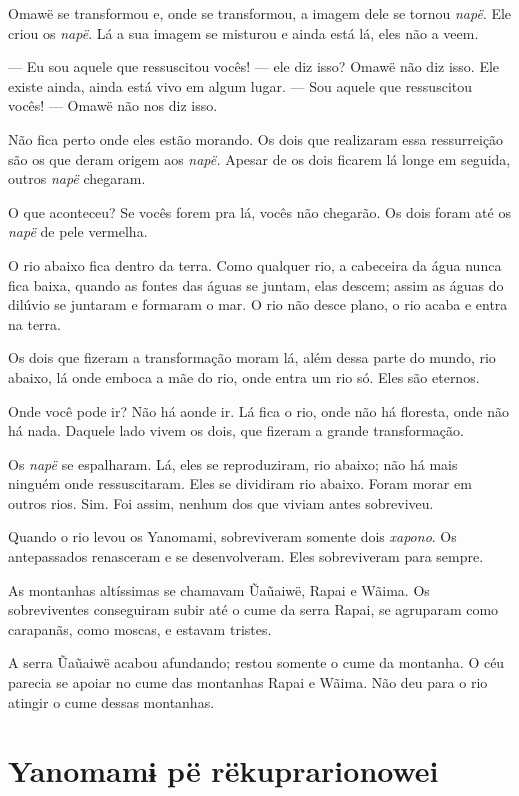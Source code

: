 Omawë se transformou e, onde se transformou, a imagem dele se
tornou \textit{napë}. Ele criou os \textit{napë}. Lá a sua imagem se misturou
e ainda está lá, eles não a veem. 

--- Eu sou aquele que ressuscitou vocês! --- ele diz isso? Omawë não diz
isso. Ele existe ainda, ainda está vivo em algum lugar. --- Sou aquele que
ressuscitou vocês! --- Omawë não nos diz isso. 

Não fica perto onde eles estão morando. Os dois que realizaram essa
ressurreição são os que deram origem aos \textit{napë.} Apesar de os dois
ficarem lá longe em seguida, outros \textit{napë} chegaram. 

O que aconteceu? Se vocês forem pra lá, vocês não chegarão. Os dois
foram até os \textit{napë} de pele vermelha. 

O rio abaixo fica dentro da terra. Como qualquer rio, a cabeceira da
água nunca fica baixa, quando as fontes das águas se juntam, elas
descem; assim as águas do dilúvio se juntaram e formaram o mar. O rio
não desce plano, o rio acaba e entra na terra. 

Os dois que fizeram a transformação moram lá, além dessa parte do mundo,
rio abaixo, lá onde emboca a mãe do rio, onde entra um rio só. Eles são
eternos. 

Onde você pode ir? Não há aonde ir. Lá fica o rio, onde não há floresta,
onde não há nada. Daquele lado vivem os dois, que fizeram a grande
transformação. 

Os \textit{napë} se espalharam. Lá, eles se reproduziram, rio abaixo; não
há mais ninguém onde ressuscitaram. Eles se dividiram rio abaixo. Foram
morar em outros rios. Sim. Foi assim, nenhum dos que viviam
antes sobreviveu. 

Quando o rio levou os Yanomami, sobreviveram somente dois \textit{xapono}. Os
antepassados renasceram e se desenvolveram. Eles sobreviveram para
sempre. 

As montanhas altíssimas se chamavam Ũaũaiwë, Rapai e Wãima. Os
sobreviventes conseguiram subir até o cume da serra Rapai, se agruparam
como carapanãs, como moscas, e estavam tristes. 

A serra Ũaũaiwë acabou afundando; restou somente o cume da montanha. O céu parecia se apoiar no cume das montanhas Rapai e Wãima. Não deu para
o rio atingir o cume dessas montanhas. 

\chapter[Yanomamɨ pë rë kuprarionowei]{Yanomamɨ pë rë\break kuprarionowei}



